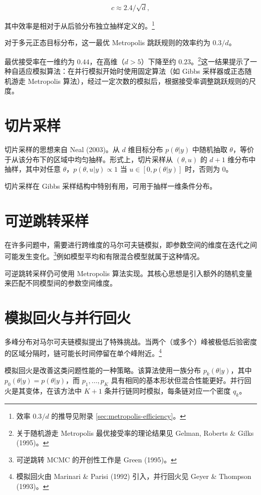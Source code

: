 \[
c \approx 2.4 / \sqrt{d},
\]

其中效率是相对于从后验分布独立抽样定义的。\footnote{效率 $0.3/d$ 的推导见附录 \cref{sec:metropolis-efficiency}。}

对于多元正态目标分布，这一最优 Metropolis 跳跃规则的效率约为 $0.3 / d$。

最优接受率在一维约为 $0.44$，在高维（$d > 5$）下降至约 $0.23$。\footnote{关于随机游走 Metropolis 最优接受率的理论结果见 Gelman, Roberts \& Gilks (1995)。}这一结果提示了一种自适应模拟算法：在并行模拟开始时使用固定算法（如 Gibbs 采样器或正态随机游走 Metropolis 算法），经过一定次数的模拟后，根据接受率调整跳跃规则的尺度。

\section{切片采样}

切片采样的思想来自 Neal (2003)。从 $d$ 维目标分布 $p(\theta | y)$ 中随机抽取 $\theta$，等价于从该分布下的区域中均匀抽样。形式上，切片采样从 $(\theta, u)$ 的 $d+1$ 维分布中抽样，其中对任意 $\theta$，$p(\theta, u | y) \propto 1$ 当 $u \in [0, p(\theta | y)]$ 时，否则为 $0$。

切片采样在 Gibbs 采样结构中特别有用，可用于抽样一维条件分布。

\section{可逆跳转采样}

在许多问题中，需要进行跨维度的马尔可夫链模拟，即参数空间的维度在迭代之间可能发生变化。\footnote{可逆跳转 MCMC 的开创性工作是 Green (1995)。}例如模型平均和有限混合模型就属于这种情况。

可逆跳转采样仍可使用 Metropolis 算法实现。其核心思想是引入额外的随机变量来匹配不同模型间的参数空间维度。

\section{模拟回火与并行回火}

多峰分布对马尔可夫链模拟提出了特殊挑战。当两个（或多个）峰被极低后验密度的区域分隔时，链可能长时间停留在单个峰附近。\footnote{模拟回火由 Marinari \& Parisi (1992) 引入，并行回火见 Geyer \& Thompson (1993)。}

模拟回火是改善这类问题性能的一种策略。该算法使用一族分布 $p_k(\theta | y)$，其中 $p_0(\theta | y) = p(\theta | y)$，而 $p_1, \ldots, p_K$ 具有相同的基本形状但混合性能更好。并行回火是其变体，在该方法中 $K+1$ 条并行链同时模拟，每条链对应一个密度 $q_k$。

